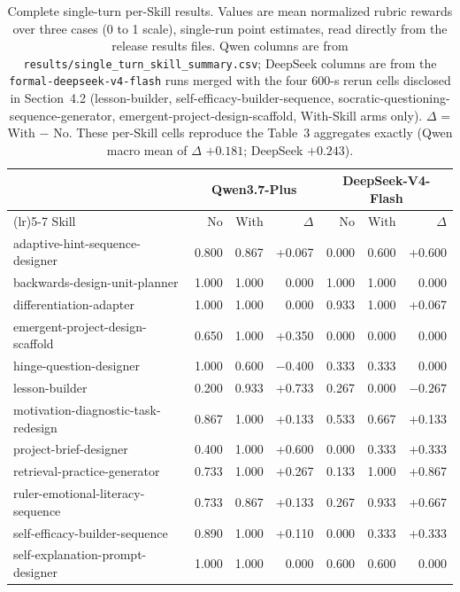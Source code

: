 \documentclass[10pt]{article}
\begin{document}
\begin{table}[H]
\centering
\scriptsize
\caption{Complete single-turn per-Skill results. Values are mean normalized rubric rewards over three cases (0 to 1 scale), single-run point estimates, read directly from the release results files. Qwen columns are from \texttt{results/single\_turn\_skill\_summary.csv}; DeepSeek columns are from the \texttt{formal-deepseek-v4-flash} runs merged with the four 600-s rerun cells disclosed in Section~4.2 (lesson-builder, self-efficacy-builder-sequence, socratic-questioning-sequence-generator, emergent-project-design-scaffold, With-Skill arms only). $\Delta$ = With $-$ No. These per-Skill cells reproduce the Table~3 aggregates exactly (Qwen macro mean of $\Delta$ $+0.181$; DeepSeek $+0.243$).}
\label{tab:fullskill}
\begin{tabularx}{0.99\textwidth}{>{\ttfamily\raggedright\arraybackslash}Xrrrrrr}
\toprule
& \multicolumn{3}{c}{Qwen3.7-Plus} & \multicolumn{3}{c}{DeepSeek-V4-Flash}\\
\cmidrule(lr){2-4}\cmidrule(lr){5-7}
Skill & No & With & $\Delta$ & No & With & $\Delta$\\
\midrule
adaptive-hint-sequence-designer & 0.800 & 0.867 & +0.067 & 0.000 & 0.600 & +0.600 \\
backwards-design-unit-planner & 1.000 & 1.000 & 0.000 & 1.000 & 1.000 & 0.000 \\
differentiation-adapter & 1.000 & 1.000 & 0.000 & 0.933 & 1.000 & +0.067 \\
emergent-project-design-scaffold & 0.650 & 1.000 & +0.350 & 0.000 & 0.000 & 0.000 \\
hinge-question-designer & 1.000 & 0.600 & $-0.400$ & 0.333 & 0.333 & 0.000 \\
lesson-builder & 0.200 & 0.933 & +0.733 & 0.267 & 0.000 & $-0.267$ \\
motivation-diagnostic-task-redesign & 0.867 & 1.000 & +0.133 & 0.533 & 0.667 & +0.133 \\
project-brief-designer & 0.400 & 1.000 & +0.600 & 0.000 & 0.333 & +0.333 \\
retrieval-practice-generator & 0.733 & 1.000 & +0.267 & 0.133 & 1.000 & +0.867 \\
ruler-emotional-literacy-sequence & 0.733 & 0.867 & +0.133 & 0.267 & 0.933 & +0.667 \\
self-efficacy-builder-sequence & 0.890 & 1.000 & +0.110 & 0.000 & 0.333 & +0.333 \\
self-explanation-prompt-designer & 1.000 & 1.000 & 0.000 & 0.600 & 0.600 & 0.000 \\

\end{tabularx}
\end{table}
\end{document}
